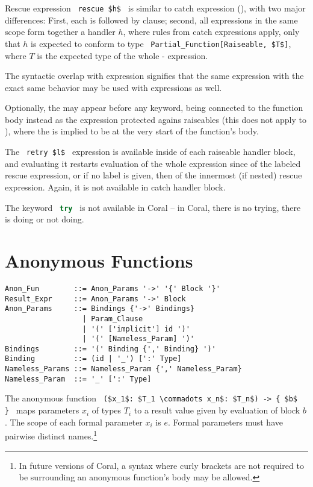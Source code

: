Rescue expression ~\lstinline!rescue $h$!~ is similar to catch expression (), with two major differences: First, each  is followed by  clause; second, all  expressions in the same scope form together a handler $h$, where rules from catch expressions apply, only that $h$ is expected to conform to type ~\lstinline!Partial_Function[Raiseable, $T$]!, where $T$ is the expected type of the whole - expression. 

The syntactic overlap with  expression signifies that the same expression with the exact same behavior may be used with  expressions as well. 

Optionally, the  may appear before any  keyword, being connected to the function body instead as the expression protected agains raiseables (this does not apply to ), where the  is implied to be at the very start of the function's body. 

The ~\lstinline!retry $l$!~ expression is available inside of each raiseable handler block, and evaluating it restarts evaluation of the whole expression since  of the labeled rescue expression, or if no label is given, then of the innermost (if nested) rescue expression. Again, it is not available in catch handler block. 

The keyword ~\lstinline[language=Java]!try!~ is not available in Coral -- in Coral, there is no trying, there is doing or not doing.  





\section{Anonymous Functions}
\label{sec:anonymous-functions}

\syntax\begin{lstlisting}
Anon_Fun        ::= Anon_Params '->' '{' Block '}'
Result_Expr     ::= Anon_Params '->' Block 
Anon_Params     ::= Bindings {'->' Bindings}
                  | Param_Clause
                  | '(' ['implicit'] id ')'
                  | '(' [Nameless_Param] ')'
Bindings        ::= '(' Binding {',' Binding} ')'
Binding         ::= (id | '_') [':' Type]
Nameless_Params ::= Nameless_Param {',' Nameless_Param}
Nameless_Param  ::= '_' [':' Type]
\end{lstlisting}

The anonymous function ~\lstinline!($x_1$: $T_1 \commadots x_n$: $T_n$) -> { $b$ }!~ maps parameters $x_i$ of types $T_i$ to a result value given by evaluation of block $b$. The scope of each formal parameter $x_i$ is $e$. Formal parameters must have pairwise distinct names.\footnote{In future versions of Coral, a syntax where curly brackets are not required to be surrounding an anonymous function's body may be allowed.}

